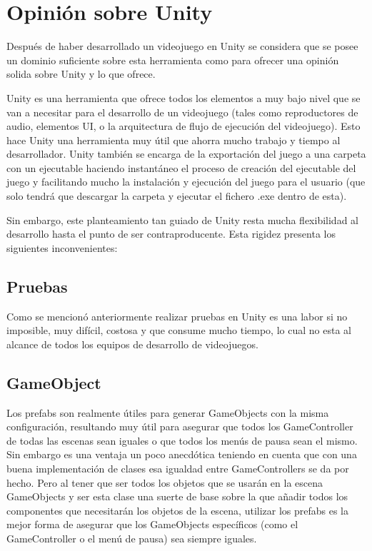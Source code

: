 \section{Opinión sobre Unity}
Después de haber desarrollado un videojuego en Unity se considera que se posee un dominio suficiente sobre esta herramienta como para ofrecer una opinión solida sobre Unity y lo que ofrece.

Unity es una herramienta que ofrece todos los elementos a muy bajo nivel que se van a necesitar para el desarrollo de un videojuego (tales como reproductores de audio, elementos UI, o la arquitectura de flujo de ejecución del videojuego). Esto hace Unity una herramienta muy útil que ahorra mucho trabajo y tiempo al desarrollador. Unity también se encarga de la exportación del juego a una carpeta con un ejecutable haciendo instantáneo el proceso de creación del ejecutable del juego y facilitando mucho la instalación y ejecución del juego para el usuario (que solo tendrá que descargar la carpeta y ejecutar el fichero .exe dentro de esta).

Sin embargo, este planteamiento tan guiado de Unity resta mucha flexibilidad al desarrollo hasta el punto de ser contraproducente. Esta rigidez presenta los siguientes inconvenientes:

\subsection{Pruebas}
Como se mencionó anteriormente realizar pruebas en Unity es una labor si no imposible, muy difícil, costosa y que consume mucho tiempo, lo cual no esta al alcance de todos los equipos de desarrollo de videojuegos.

\subsection{GameObject}
Los prefabs son realmente útiles para generar GameObjects con la misma configuración, resultando muy útil para asegurar que todos los GameController de todas las escenas sean iguales o que todos los menús de pausa sean el mismo. Sin embargo es una ventaja un poco anecdótica teniendo en cuenta que con una buena implementación de clases esa igualdad entre GameControllers se da por hecho. Pero al tener que ser todos los objetos que se usarán en la escena GameObjects y ser esta clase una suerte de base sobre la que añadir todos los componentes que necesitarán los objetos de la escena, utilizar los prefabs es la mejor forma de asegurar que los GameObjects específicos (como el GameController o el menú de pausa) sea siempre iguales.

